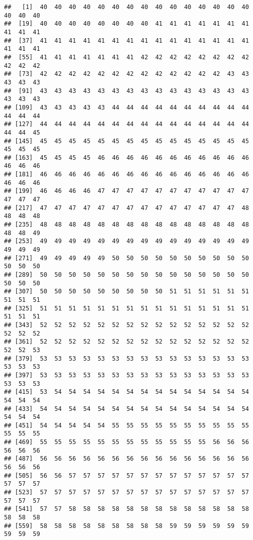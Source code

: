 \documentclass[
  spanish,
]{article}
\begin{document}
\begin{verbatim}
##   [1]  40  40  40  40  40  40  40  40  40  40  40  40  40  40  40  40  40  40
##  [19]  40  40  40  40  40  40  40  40  41  41  41  41  41  41  41  41  41  41
##  [37]  41  41  41  41  41  41  41  41  41  41  41  41  41  41  41  41  41  41
##  [55]  41  41  41  41  41  41  41  42  42  42  42  42  42  42  42  42  42  42
##  [73]  42  42  42  42  42  42  42  42  42  42  42  42  42  43  43  43  43  43
##  [91]  43  43  43  43  43  43  43  43  43  43  43  43  43  43  43  43  43  43
## [109]  43  43  43  43  43  44  44  44  44  44  44  44  44  44  44  44  44  44
## [127]  44  44  44  44  44  44  44  44  44  44  44  44  44  44  44  44  44  45
## [145]  45  45  45  45  45  45  45  45  45  45  45  45  45  45  45  45  45  45
## [163]  45  45  45  45  46  46  46  46  46  46  46  46  46  46  46  46  46  46
## [181]  46  46  46  46  46  46  46  46  46  46  46  46  46  46  46  46  46  46
## [199]  46  46  46  46  47  47  47  47  47  47  47  47  47  47  47  47  47  47
## [217]  47  47  47  47  47  47  47  47  47  47  47  47  47  47  48  48  48  48
## [235]  48  48  48  48  48  48  48  48  48  48  48  48  48  48  48  48  48  49
## [253]  49  49  49  49  49  49  49  49  49  49  49  49  49  49  49  49  49  49
## [271]  49  49  49  49  49  50  50  50  50  50  50  50  50  50  50  50  50  50
## [289]  50  50  50  50  50  50  50  50  50  50  50  50  50  50  50  50  50  50
## [307]  50  50  50  50  50  50  50  50  50  51  51  51  51  51  51  51  51  51
## [325]  51  51  51  51  51  51  51  51  51  51  51  51  51  51  51  51  51  51
## [343]  52  52  52  52  52  52  52  52  52  52  52  52  52  52  52  52  52  52
## [361]  52  52  52  52  52  52  52  52  52  52  52  52  52  52  52  52  52  53
## [379]  53  53  53  53  53  53  53  53  53  53  53  53  53  53  53  53  53  53
## [397]  53  53  53  53  53  53  53  53  53  53  53  53  53  53  53  53  53  53
## [415]  53  54  54  54  54  54  54  54  54  54  54  54  54  54  54  54  54  54
## [433]  54  54  54  54  54  54  54  54  54  54  54  54  54  54  54  54  54  54
## [451]  54  54  54  54  54  55  55  55  55  55  55  55  55  55  55  55  55  55
## [469]  55  55  55  55  55  55  55  55  55  55  55  55  56  56  56  56  56  56
## [487]  56  56  56  56  56  56  56  56  56  56  56  56  56  56  56  56  56  56
## [505]  56  56  57  57  57  57  57  57  57  57  57  57  57  57  57  57  57  57
## [523]  57  57  57  57  57  57  57  57  57  57  57  57  57  57  57  57  57  57
## [541]  57  57  58  58  58  58  58  58  58  58  58  58  58  58  58  58  58  58
## [559]  58  58  58  58  58  58  58  58  58  59  59  59  59  59  59  59  59  59

\end{verbatim}
\end{document}
